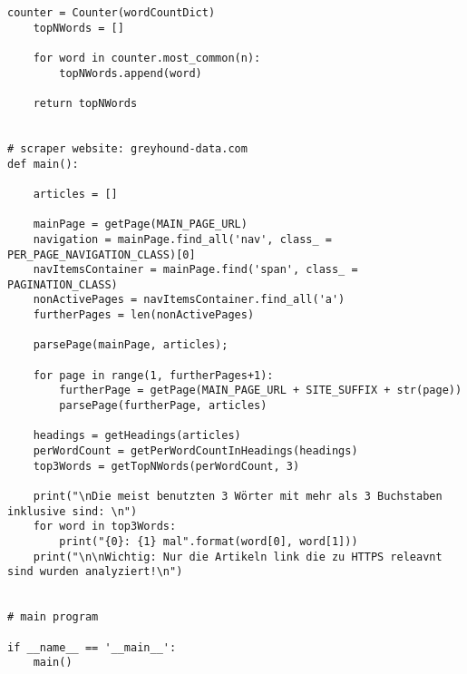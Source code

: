 \begin{enumerate}
\begin{lstlisting}[style=py]
    counter = Counter(wordCountDict)
    topNWords = []
    
    for word in counter.most_common(n):
        topNWords.append(word)

    return topNWords


# scraper website: greyhound-data.com
def main():

    articles = []

    mainPage = getPage(MAIN_PAGE_URL)
    navigation = mainPage.find_all('nav', class_ = PER_PAGE_NAVIGATION_CLASS)[0]
    navItemsContainer = mainPage.find('span', class_ = PAGINATION_CLASS)
    nonActivePages = navItemsContainer.find_all('a')
    furtherPages = len(nonActivePages)

    parsePage(mainPage, articles);

    for page in range(1, furtherPages+1):
        furtherPage = getPage(MAIN_PAGE_URL + SITE_SUFFIX + str(page))
        parsePage(furtherPage, articles)

    headings = getHeadings(articles)
    perWordCount = getPerWordCountInHeadings(headings)
    top3Words = getTopNWords(perWordCount, 3)

    print("\nDie meist benutzten 3 Wörter mit mehr als 3 Buchstaben inklusive sind: \n")
    for word in top3Words:
        print("{0}: {1} mal".format(word[0], word[1]))
    print("\n\nWichtig: Nur die Artikeln link die zu HTTPS releavnt sind wurden analyziert!\n")


# main program

if __name__ == '__main__':
    main()
\end{lstlisting} 


\end{enumerate}




